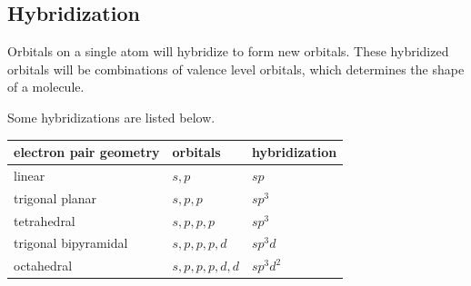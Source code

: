 \subsection{Hybridization}
Orbitals on a single atom will hybridize to form new orbitals. These hybridized
orbitals will be combinations of valence level orbitals, which determines the
shape of a molecule.

Some hybridizations are listed below.

\begin{table}[]
\centering
\begin{tabular}{|l|l|l|}
\hline
\textbf{electron pair geometry} & \textbf{orbitals} & \textbf{hybridization} \\ \hline
linear                          & $s,p$             & $sp$                   \\ \hline
trigonal planar                 & $s,p,p$           & $sp^3$                 \\ \hline
tetrahedral                     & $s,p,p,p$         & $sp^3$                 \\ \hline
trigonal bipyramidal            & $s,p,p,p,d$       & $sp^3d$                \\ \hline
octahedral                      & $s,p,p,p,d,d$     & $sp^3d^2$              \\ \hline
\end{tabular}
\end{table}
